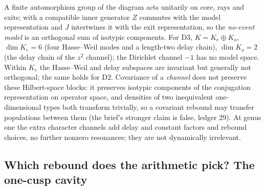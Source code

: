 \begin{proposition}
\label{prop:covariant-channel-blocks}
A finite automorphism group of the diagram acts unitarily on core, rays and exits; with a compatible inner
generator $Z$ commutes with the model representation and $J$ intertwines it with the exit representation, so
the \emph{no-event model} is an orthogonal sum of isotypic components. For $\mathrm{D3}$, $K = K_e\oplus K_o$,
$\dim K_e = 6$ (four Hasse--Weil modes and a length-two delay chain), $\dim K_o = 2$ (the delay chain of the
$z^2$ channel); the Dirichlet channel $-1$ has no model space. Within $K_e$ the Hasse--Weil and delay
subspaces are invariant but generally not orthogonal; the same holds for $\mathrm{D2}$. Covariance of a
\emph{channel} does not preserve these Hilbert-space blocks: it preserves isotypic components of the
conjugation representation on operator space, and densities of two inequivalent one-dimensional types both
transform trivially, so a covariant rebound may transfer populations between them (the brief's stronger claim
is false, ledger 29). At genus one the extra character channels add delay and constant factors and rebound
choices, no further nonzero resonances; they are not dynamically irrelevant.
\end{proposition}

\subsection{Which rebound does the arithmetic pick? The one-cusp cavity}

